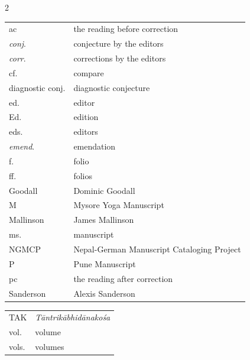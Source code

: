 \null\vspace{0.1cm}
\begin{eng}
\centerline{}
\end{eng}
\vskip 22pt

\begin{multicols}{2}
\begin{tabular}{p{} p{}}
ac & the reading before correction\\
\emph{conj}. & conjecture by the editors\\
\emph{corr}. & corrections by the editors\\
cf. & compare\\
diagnostic conj. & diagnostic conjecture\\
ed. & editor\\
Ed. & edition\\
eds. & editors\\
\emph{emend}. & emendation\\
f. & folio\\
ff. & folios\\
Goodall & Dominic Goodall\\
M & Mysore Yoga Manuscript\\
Mallinson & James Mallinson\\
ms. & manuscript\\
NGMCP & Nepal-German Manuscript Cataloging Project\\
P & Pune Manuscript\\
pc & the reading after correction\\
Sanderson & Alexis Sanderson
\end{tabular}
\columnbreak

\begin{tabular}{p{} p{}}
TAK & \emph{Tāntrikābhidānakośa}\\
vol. & volume\\
vols. & volumes\\
\end{tabular}
\end{multicols}

